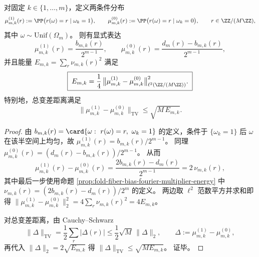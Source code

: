 \begin{proposition}[条件偏置能量的决策论刻画]\label{prop:fold-fiber-bias-energy-decision-theoretic}
对固定 \(k\in\{1,\dots,m\}\)，定义两条件分布
\[
\mu_{m,k}^{(1)}(r):=\PP\bigl(r(\omega)=r\mid \omega_k=1\bigr),
\qquad
\mu_{m,k}^{(0)}(r):=\PP\bigl(r(\omega)=r\mid \omega_k=0\bigr),
\qquad r\in\ZZ/(M\ZZ),
\]
其中 \(\omega\sim\mathrm{Unif}(\Omega_m)\)。
则有显式表达
\[
\mu_{m,k}^{(1)}(r)=\frac{b_{m,k}(r)}{2^{m-1}},
\qquad
\mu_{m,k}^{(0)}(r)=\frac{d_m(r)-b_{m,k}(r)}{2^{m-1}},
\]
并且能量 \(E_{m,k}=\sum_r \nu_{m,k}(r)^2\) 满足
\[
\boxed{\;E_{m,k}=\frac14\,\bigl\|\mu_{m,k}^{(1)}-\mu_{m,k}^{(0)}\bigr\|_{\ell^2(\ZZ/(M\ZZ))}^{2}.\;}
\]
特别地，总变差距离满足
\[
\bigl\|\mu_{m,k}^{(1)}-\mu_{m,k}^{(0)}\bigr\|_{\mathrm{TV}}
\le \sqrt{M\,E_{m,k}}.
\]
\end{proposition}
\begin{proof}
由 \(b_{m,k}(r)=\card\{\omega:\ r(\omega)=r,\ \omega_k=1\}\) 的定义，条件于 \(\{\omega_k=1\}\) 后 \(\omega\) 在该半空间上均匀，故
\(\mu_{m,k}^{(1)}(r)=b_{m,k}(r)/2^{m-1}\)。
同理
\(\mu_{m,k}^{(0)}(r)=(d_m(r)-b_{m,k}(r))/2^{m-1}\)。
从而
\[
\mu_{m,k}^{(1)}(r)-\mu_{m,k}^{(0)}(r)
=\frac{2b_{m,k}(r)-d_m(r)}{2^{m-1}}
=2\,\nu_{m,k}(r),
\]
其中最后一步使用命题 \ref{prop:fold-fiber-bias-fourier-multiplier-energy} 中 \(\nu_{m,k}(r)=(2b_{m,k}(r)-d_m(r))/2^m\) 的定义。
两边取 \(\ell^2\) 范数平方并求和即得
\(
\|\mu_{m,k}^{(1)}-\mu_{m,k}^{(0)}\|_2^2=4\sum_r\nu_{m,k}(r)^2=4E_{m,k}
\)。
\par
对总变差距离，由 Cauchy--Schwarz
\[
\|\Delta\|_{\mathrm{TV}}
=\frac12\sum_r|\Delta(r)|
\le \frac12\sqrt{M}\,\|\Delta\|_2,
\qquad
\Delta:=\mu_{m,k}^{(1)}-\mu_{m,k}^{(0)},
\]
再代入 \(\|\Delta\|_2=2\sqrt{E_{m,k}}\) 得 \(\|\Delta\|_{\mathrm{TV}}\le \sqrt{M E_{m,k}}\)。
证毕。
\end{proof}

